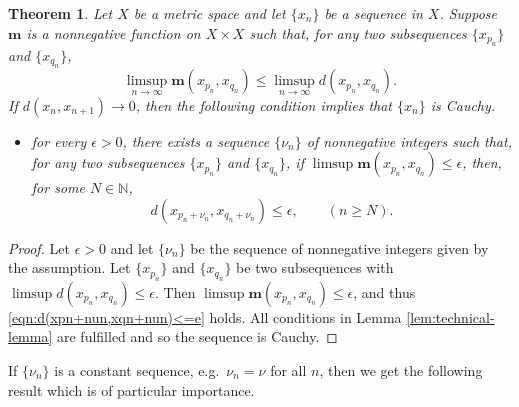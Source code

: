\documentclass[a4paper,10pt,twoside,reqno]{amsart}
\newtheorem{thm}{Theorem}[section]
\theoremstyle{definition}
\theoremstyle{remark}
\newcommand{\set}[1]{\{#1\}}
\newcommand{\e}{\epsilon}
\newcommand{\N}{\mathbb{N}}
\newcommand{\m}{\mathbf{m}}
\numberwithin{equation}{section}
\begin{document}
\begin{thm}
\label{thm:main}
  Let $X$ be a metric space and let $\{x_n\}$ be a sequence in $X$.
  Suppose $\m$ is a nonnegative function on $X\times X$ such that,
  for any two subsequences $\{x_{p_n}\}$ and $\{x_{q_n}\}$,
  \begin{equation}\label{eqn:limsup m <= limsup d}
      \limsup_{n\to\infty} \m(x_{p_n},x_{q_n})
      \leq \limsup_{n\to\infty} d(x_{p_n},x_{q_n}).
  \end{equation}
  If $d(x_n,x_{n+1})\to0$, then the following condition implies that
  $\set{x_n}$ is Cauchy.
  \begin{itemize}
    \item for every $\e>0$, there exists a sequence $\set{\nu_n}$
    of nonnegative integers such that, for any two subsequences
    $\{x_{p_n}\}$ and $\{x_{q_n}\}$, if\/ $\limsup \m(x_{p_n},x_{q_n})\leq \e$,
    then, for some $N\in\N$,
    \begin{equation*}
      d(x_{p_n+\nu_n},x_{q_n+\nu_n}) \leq \e, \qquad (n\geq N).
    \end{equation*}
  \end{itemize}
\end{thm}

\begin{proof}
  Let $\e>0$ and let $\{\nu_n\}$ be the sequence of nonnegative integers given by
  the assumption. Let $\{x_{p_n}\}$ and $\{x_{q_n}\}$ be two subsequences with
  $\limsup d(x_{p_n},x_{q_n})\leq \e$. Then $\limsup \m(x_{p_n},x_{q_n})\leq \e$,
  and thus \eqref{eqn:d(xpn+nun,xqn+nun)<=e} holds. All conditions in
  Lemma \ref{lem:technical-lemma} are fulfilled and so the sequence
  is Cauchy.
\end{proof}

If $\{\nu_n\}$ is a constant sequence, e.g.\ $\nu_n=\nu$ for all $n$,
then we get the following result which is of particular importance.
\end{document}
